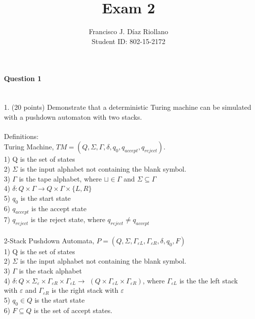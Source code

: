 \documentclass{report}
\title{Exam 2}
\author{Francisco J. Díaz Riollano \\ Student ID: 802-15-2172 }
\newcommand{\me}[1]{
\begin{math}
#1
\end{math}
}
\begin{document}
\maketitle
\paragraph{\Large{Question 1\\ \\}}
1. (20 points) Demonstrate that a deterministic Turing machine can be simulated with a pushdown automaton with two stacks.  \\ \\
Definitions: \\
Turing Machine, \me{TM =(Q,\Sigma, \Gamma, \delta, q_0,q_{accept}, q_{reject}). } \\
1) Q is the set of states \\
2)\me{\Sigma} is the input alphabet not containing the blank symbol. \\
3) \me{\Gamma} is the tape alphabet, where $\sqcup \in \Gamma $ and $\Sigma \subseteq \Gamma$ \\
4) \me{\delta: Q \times \Gamma \to Q \times \Gamma \times  \{L,R\}}\\
5) $q_0$ is the start state\\
6) $q_{accept}$ is the accept state \\
7) $q_{reject}$ is the reject state, where $q_{reject} \neq q_{accept}$
\\ \\
2-Stack Pushdown Automata, \me{P =(Q,\Sigma, \Gamma_{\varepsilon L},\Gamma_{\varepsilon R}, \delta, q_0,F)} \\
1) Q is the set of states \\
2)\me{\Sigma} is the input alphabet not containing the blank symbol. \\
3) \me{\Gamma} is the stack alphabet \\
4) \me{\delta: Q \times \Sigma_{\varepsilon} \times \Gamma_{\varepsilon R} \times \Gamma_{\varepsilon L}  \to } $(Q \times \Gamma_{\varepsilon L}\times\Gamma_{\varepsilon R})$, where $\Gamma_{\varepsilon L} $ is the the left stack with    $\varepsilon$ and $\Gamma_{\varepsilon R}$ is the right stack with $\varepsilon$ \\
5) $q_0 \in Q$ is the start state\\
6) $F \subseteq Q$ is the set of accept states. \\ \\ 
\end{document}

